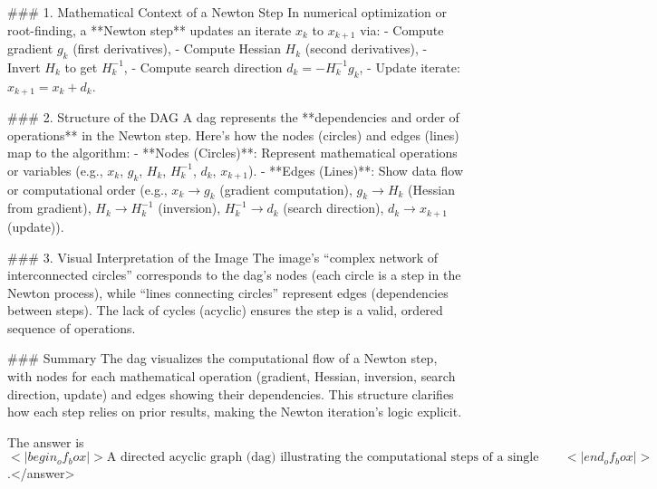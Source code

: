 ### 1. Mathematical Context of a Newton Step  
In numerical optimization or root-finding, a **Newton step** updates an iterate \( x_k \) to \( x_{k+1} \) via:  
- Compute gradient \( g_k \) (first derivatives),  
- Compute Hessian \( H_k \) (second derivatives),  
- Invert \( H_k \) to get \( H_k^{-1} \),  
- Compute search direction \( d_k = -H_k^{-1} g_k \),  
- Update iterate: \( x_{k+1} = x_k + d_k \).  

### 2. Structure of the DAG  
A dag represents the **dependencies and order of operations** in the Newton step. Here’s how the nodes (circles) and edges (lines) map to the algorithm:  
- **Nodes (Circles)**: Represent mathematical operations or variables (e.g., \( x_k \), \( g_k \), \( H_k \), \( H_k^{-1} \), \( d_k \), \( x_{k+1} \)).  
- **Edges (Lines)**: Show data flow or computational order (e.g., \( x_k \to g_k \) (gradient computation), \( g_k \to H_k \) (Hessian from gradient), \( H_k \to H_k^{-1} \) (inversion), \( H_k^{-1} \to d_k \) (search direction), \( d_k \to x_{k+1} \) (update)).  

### 3. Visual Interpretation of the Image  
The image’s “complex network of interconnected circles” corresponds to the dag’s nodes (each circle is a step in the Newton process), while “lines connecting circles” represent edges (dependencies between steps). The lack of cycles (acyclic) ensures the step is a valid, ordered sequence of operations.  

### Summary  
The dag visualizes the computational flow of a Newton step, with nodes for each mathematical operation (gradient, Hessian, inversion, search direction, update) and edges showing their dependencies. This structure clarifies how each step relies on prior results, making the Newton iteration’s logic explicit.  

The answer is \(<|begin_of_box|>\text{A directed acyclic graph (dag) illustrating the computational steps of a single Newton step, with nodes representing mathematical operations (e.g., gradient, Hessian, inversion) and edges showing dependencies between them.}<|end_of_box|>\).</answer>